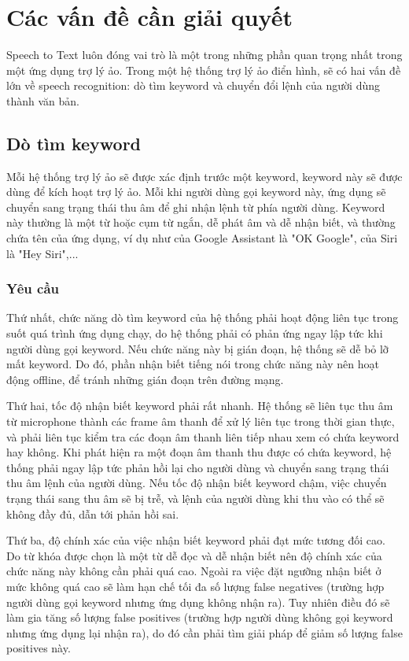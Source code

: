 \section{Các vấn đề cần giải quyết}

Speech to Text luôn đóng vai trò là một trong những phần quan trọng nhất trong một ứng dụng trợ lý ảo. Trong một hệ thống trợ lý ảo điển hình, sẽ có hai vấn đề lớn về speech recognition: dò tìm keyword và chuyển đổi lệnh của người dùng thành văn bản.

\subsection{Dò tìm keyword}

Mỗi hệ thống trợ lý ảo sẽ được xác định trước một keyword, keyword này sẽ được dùng để kích hoạt trợ lý ảo. Mỗi khi người dùng gọi keyword này, ứng dụng sẽ chuyển sang trạng thái thu âm để ghi nhận lệnh từ phía người dùng. Keyword này thường là một từ hoặc cụm từ ngắn, dễ phát âm và dễ nhận biết, và thường chứa tên của ứng dụng, ví dụ như của Google Assistant là "OK Google", của Siri là "Hey Siri",...

\subsubsection{Yêu cầu}

Thứ nhất, chức năng dò tìm keyword của hệ thống phải hoạt động liên tục trong suốt quá trình ứng dụng chạy, do hệ thống phải có phản ứng ngay lập tức khi người dùng gọi keyword. Nếu chức năng này bị gián đoạn, hệ thống sẽ dễ bỏ lỡ mất keyword. Do đó, phần nhận biết tiếng nói trong chức năng này nên hoạt động offline, để tránh những gián đoạn trên đường mạng.

Thứ hai, tốc độ nhận biết keyword phải rất nhanh. Hệ thống sẽ liên tục thu âm từ microphone thành các frame âm thanh để xử lý liên tục trong thời gian thực, và phải liên tục kiểm tra các đoạn âm thanh liên tiếp nhau xem có chứa keyword hay không. Khi phát hiện ra một đoạn âm thanh thu được có chứa keyword, hệ thống phải ngay lập tức phản hồi lại cho người dùng và chuyển sang trạng thái thu âm lệnh của người dùng. Nếu tốc độ nhận biết keyword chậm, việc chuyển trạng thái sang thu âm sẽ bị trễ, và lệnh của người dùng khi thu vào có thể sẽ không đầy đủ, dẫn tới phản hồi sai.

Thứ ba, độ chính xác của việc nhận biết keyword phải đạt mức tương đối cao. Do từ khóa được chọn là một từ dễ đọc và dễ nhận biết nên độ chính xác của chức năng này không cần phải quá cao. Ngoài ra việc đặt ngưỡng nhận biết ở mức không quá cao sẽ làm hạn chế tối đa số lượng false negatives (trường hợp người dùng gọi keyword nhưng ứng dụng không nhận ra). Tuy nhiên điều đó sẽ làm gia tăng số lượng false positives (trường hợp người dùng không gọi keyword nhưng ứng dụng lại nhận ra), do đó cần phải tìm giải pháp để giảm số lượng false positives này.

